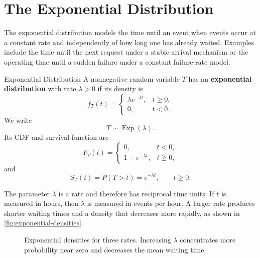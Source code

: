 \section{The Exponential Distribution}
\label{sec:exponential-distribution}

The exponential distribution models the time until an event when events occur at a constant rate and independently of how long one has already waited. Examples include the time until the next request under a stable arrival mechanism or the operating time until a sudden failure under a constant failure-rate model.

\begin{definition}{Exponential Distribution}
A nonnegative random variable $T$ has an \textbf{exponential distribution} with rate $\lambda>0$ if its density is
\[
f_T(t)=
\begin{cases}
\lambda e^{-\lambda t}, & t\geq0,\\
0, & t<0.
\end{cases}
\]
We write
\[
    T\sim\operatorname{Exp}(\lambda).
\]
Its CDF and survival function are
\[
F_T(t)=
\begin{cases}
0, & t<0,\\
1-e^{-\lambda t}, & t\geq0,
\end{cases}
\]
and
\[
    S_T(t)=P(T>t)=e^{-\lambda t}, \qquad t\geq0.
\]
\end{definition}

The parameter $\lambda$ is a rate and therefore has reciprocal time units. If $t$ is measured in hours, then $\lambda$ is measured in events per hour. A larger rate produces shorter waiting times and a density that decreases more rapidly, as shown in \autoref{fig:exponential-densities}.

\begin{figure}[htbp]
\centering
{}
\caption{Exponential densities for three rates. Increasing $\lambda$ concentrates more probability near zero and decreases the mean waiting time.}
\label{fig:exponential-densities}
\end{figure}

